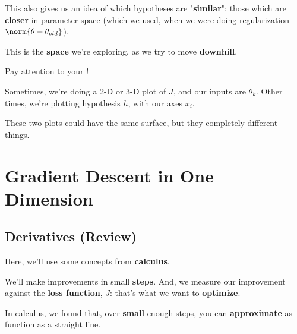         This also gives us an idea of which hypotheses are "\textbf{similar}": those which are \textbf{closer} in parameter space (which we used, when we were doing regularization $\norm{\theta-\theta_{old}}$).
        
        This is the \textbf{space} we're exploring, as we try to move \textbf{downhill}. \\
        
        \begin{clarification}
            Pay attention to your ! 
            
            Sometimes, we're doing a 2-D or 3-D plot of $J$, and our inputs are $\theta_k$. Other times, we're plotting hypothesis $h$, with our axes $x_i$.
            
            These two plots could have the same surface, but they  completely different things.
        \end{clarification}
        

        
        

        
\pagebreak

\section{Gradient Descent in One Dimension}

    \subsection{Derivatives (Review)}
    
        Here, we'll use some concepts from \textbf{calculus}.
        
        We'll make improvements in small \textbf{steps}. And, we measure our improvement against the \textbf{loss function}, $J$: that's what we want to \textbf{optimize}.
        
        In calculus, we found that, over \textbf{small} enough steps, you can \textbf{approximate} as function as a straight line.\\
        
